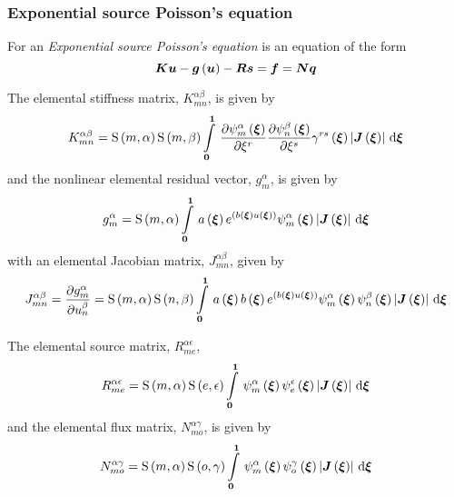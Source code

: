 \subsubsection{Exponential source Poisson's equation}

For an \emph{Exponential source Poisson's equation}
 is an equation of the form
\begin{equation}
  \matr{K}\vect{u}-\fnof{\vect{g}}{\vect{u}}-\matr{R}\vect{s}=\vect{f}=\matr{N}\vect{q}
\end{equation}

The elemental stiffness matrix, $K^{\alpha\beta}_{mn}$, is given by
\begin{equation}
  K^{\alpha\beta}_{mn}=\gsf{m}{\alpha}\gsf{m}{\beta}
  \gint{\vectr{0}}{\vectr{1}}{\delby{\gbfn{m}{\alpha}{\vectr{\xi}}}{\xi^{r}}
      \delby{\gbfn{n}{\beta}{\vectr{\xi}}}{\xi^{s}}\fnof{\gamma^{rs}}{\vectr{\xi}}
    \abs{\fnof{\matr{J}}{\vectr{\xi}}}}{\vectr{\xi}}
  \label{eqn:elementalfemlhs2}
\end{equation}
and the nonlinear elemental residual vector, $g^{\alpha}_{m}$, is given by
\begin{equation}
  g^{\alpha}_{m}=\gsf{m}{\alpha}\gint{\vectr{0}}{\vectr{1}}{\fnof{a}{\vectr{\xi}}
    e^{\pbrac{\fnof{b}{\vectr{\xi}}\fnof{u}{\vectr{\xi}}}}\gbfn{m}{\alpha}{\vectr{\xi}}
    \abs{\fnof{\matr{J}}{\vectr{\xi}}}}{\vectr{\xi}}
\end{equation}
with an elemental Jacobian matrix, $J^{\alpha\beta}_{mn}$, given by
\begin{equation}
  J^{\alpha\beta}_{mn}=\delby{g^{\alpha}_{m}}{u^{\beta}_{n}}=\gsf{m}{\alpha}\gsf{n}{\beta}\gint{\vectr{0}}{\vectr{1}}{
    \fnof{a}{\vectr{\xi}}\fnof{b}{\vectr{\xi}}e^{\pbrac{\fnof{b}{\vectr{\xi}}\fnof{u}{\vectr{\xi}}}}
    \gbfn{m}{\alpha}{\vectr{\xi}}\gbfn{n}{\beta}{\vectr{\xi}}
    \abs{\fnof{\matr{J}}{\vectr{\xi}}}}{\vectr{\xi}}
\end{equation}

The elemental source matrix, $R^{\alpha\epsilon}_{me}$, 
\begin{equation}
  R^{\alpha\epsilon}_{me}=\gsf{m}{\alpha}\gsf{e}{\epsilon}
  \gint{\vectr{0}}{\vectr{1}}{\gbfn{m}{\alpha}{\vectr{\xi}}\gbfn{e}{\epsilon}{\vectr{\xi}}
    \abs{\fnof{\matr{J}}{\vectr{\xi}}}}{\vectr{\xi}}
\end{equation}
and the elemental flux matrix, $N^{\alpha\gamma}_{mo}$, is given by
\begin{equation}
  N^{\alpha\gamma}_{mo} =\gsf{m}{\alpha}\gsf{o}{\gamma}
  \gint{\vectr{0}}{\vectr{1}}{\gbfn{m}{\alpha}{\vectr{\xi}}\gbfn{o}{\gamma}{\vectr{\xi}}
    \abs{\fnof{\matr{J}}{\vectr{\xi}}}}{\vectr{\xi}}
\end{equation}

